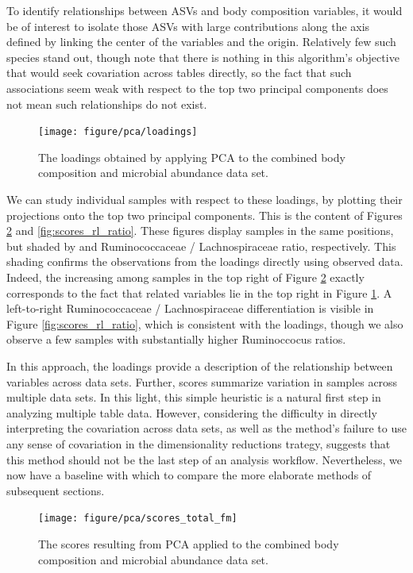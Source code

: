 \documentclass{article}
\begin{document}
To identify relationships between ASVs and body composition variables, it would
be of interest to isolate those ASVs with large contributions along the axis
defined by linking the center of the  variables and the origin. Relatively
few such species stand out, though note that there is nothing in this
algorithm's objective that would seek covariation across tables directly, so the
fact that such associations seem weak with respect to the top two principal
components does not mean such relationships do not exist.

\begin{figure}[ht]
  \centering
  \texttt{[image: figure/pca/loadings]}
  \caption{The loadings obtained by applying PCA to the combined body
    composition and microbial abundance data set. \label{fig:loadings} }
\end{figure}

We can study individual samples with respect to these loadings, by plotting
their projections onto the top two principal components. This is the content of
Figures \ref{fig:scores_total_fm} and \ref{fig:scores_rl_ratio}. These figures
display samples in the same positions, but shaded by  and Ruminococcaceae
/ Lachnospiraceae ratio, respectively. This shading confirms the observations
from the loadings directly using observed data. Indeed, the increasing
among samples in the top right of Figure \ref{fig:scores_total_fm} exactly
corresponds to the fact that  related variables lie in the top right in
Figure \ref{fig:loadings}. A left-to-right Ruminococcaceae /
Lachnospiraceae differentiation is visible in Figure \ref{fig:scores_rl_ratio},
which is consistent with the loadings, though we also observe a few samples with
substantially higher Ruminoccocus ratios.

In this approach, the loadings provide a description of the relationship between
variables across data sets. Further, scores summarize variation in samples
across multiple data sets. In this light, this simple heuristic is a natural
first step in analyzing multiple table data. However, considering the difficulty
in directly interpreting the covariation across data sets, as well as the
method's failure to use any sense of covariation in the dimensionality
reductions trategy, suggests that this method should not be the last step of an
analysis workflow. Nevertheless, we now have a baseline with which to compare
the more elaborate methods of subsequent sections.

\begin{figure}[ht]
  \centering
  \texttt{[image: figure/pca/scores\_total\_fm]}
  \caption{The scores resulting from PCA applied to the combined body
    composition and microbial abundance data set.\label{fig:scores_total_fm} }
\end{figure}
\end{document}
